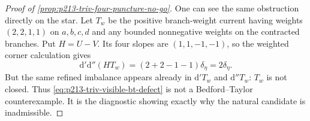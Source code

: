\begin{proof}[Proof of \cref{prop:p213-triv-four-puncture-no-go}]
One can see the same obstruction directly on the star.  Let \(T_w\) be the
positive branch-weight current having weights \((2,2,1,1)\) on
\(a,b,c,d\) and any bounded nonnegative weights on the contracted branches.
Put \(H=U-V\).  Its four slopes are \((1,1,-1,-1)\), so the weighted corner
calculation gives
\begin{equation}
                   \mathrm d'\mathrm d''(H T_w)
                       =(2+2-1-1)\delta_\eta
                       =2\delta_\eta.
\label{eq:p213-triv-visible-bt-defect}
\end{equation}
But the same refined imbalance appears already in
\(\mathrm d'T_w\) and \(\mathrm d''T_w\): \(T_w\) is not closed.  Thus
\eqref{eq:p213-triv-visible-bt-defect} is not a Bedford--Taylor
counterexample.  It is the diagnostic showing exactly why the natural
candidate is inadmissible.
\end{proof}

